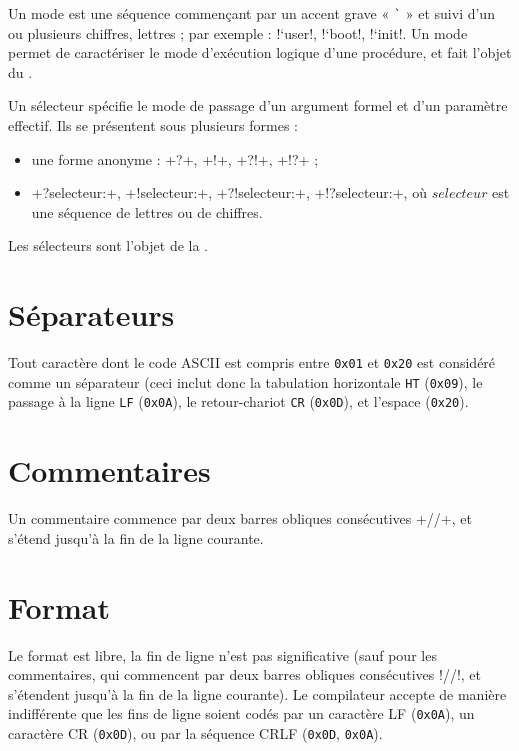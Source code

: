 
Un mode est une séquence commençant par un accent grave « \texttt{\`} » et suivi d'un ou plusieurs chiffres, lettres ; par exemple : \plm!`user!, \plm!`boot!, \plm!`init!. Un mode permet de caractériser le mode d'exécution logique d'une procédure, et fait l'objet du .










Un sélecteur spécifie le mode de passage d'un argument formel et d'un paramètre effectif. Ils se présentent sous plusieurs formes :
\begin{itemize}
  \item une forme anonyme : \plm+?+, \plm+!+, \plm+?!+, \plm+!?+ ;
  \item \plm+?selecteur:+, \plm+!selecteur:+, \plm+?!selecteur:+, \plm+!?selecteur:+, où $selecteur$ est une séquence de lettres ou de chiffres.
\end{itemize}



Les sélecteurs sont l'objet de la .

\section{Séparateurs}

Tout caractère dont le code ASCII est compris entre \texttt{0x01} et \texttt{0x20} est considéré comme un séparateur (ceci inclut donc la tabulation horizontale \texttt{HT} (\texttt{0x09}), le passage à la ligne \texttt{LF} (\texttt{0x0A}), le retour-chariot \texttt{CR} (\texttt{0x0D}), et l’espace (\texttt{0x20}).









\section{Commentaires}

Un commentaire commence par deux barres obliques consécutives \plm+//+, et s’étend jusqu’à la fin de la ligne courante.




\section{Format}

Le format est libre, la fin de ligne n’est pas significative (sauf pour les commentaires, qui commencent par deux barres obliques consécutives \plm!//!, et s’étendent jusqu’à la fin de la ligne courante). Le compilateur accepte de manière indifférente que les fins de ligne soient codés par un caractère LF (\texttt{0x0A}), un caractère CR (\texttt{0x0D}), ou par la séquence CRLF (\texttt{0x0D}, \texttt{0x0A}).

